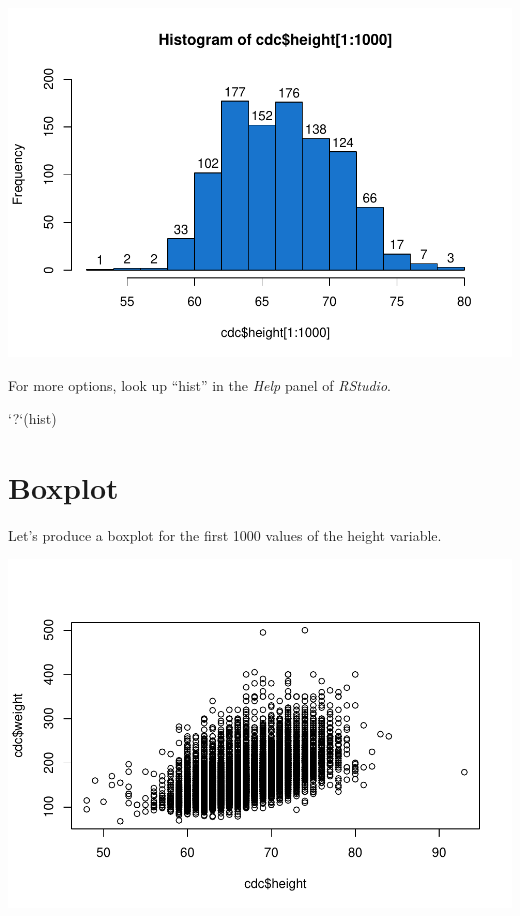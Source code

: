\documentclass[
]{book}
\newenvironment{Shaded}{\begin{snugshade}}{\end{snugshade}}
\newcommand{\DataTypeTok}[1]{\textcolor[rgb]{0.13,0.29,0.53}{#1}}
\newcommand{\DecValTok}[1]{\textcolor[rgb]{0.00,0.00,0.81}{#1}}
\newcommand{\KeywordTok}[1]{\textcolor[rgb]{0.13,0.29,0.53}{\textbf{#1}}}
\newcommand{\NormalTok}[1]{#1}
\newcommand{\OperatorTok}[1]{\textcolor[rgb]{0.81,0.36,0.00}{\textbf{#1}}}
\newcommand{\StringTok}[1]{\textcolor[rgb]{0.31,0.60,0.02}{#1}}
\begin{document}
\includegraphics{_main_files/figure-latex/unnamed-chunk-174-1.pdf}

For more options, look up ``hist'' in the \emph{Help} panel of \emph{RStudio}.

\begin{Shaded}
\begin{Highlighting}[]
\StringTok{`}\DataTypeTok{?}\StringTok{`}\NormalTok{(hist)}
\end{Highlighting}
\end{Shaded}

\hypertarget{boxplot}{%
\section{Boxplot}\label{boxplot}}

Let's produce a boxplot for the first 1000 values of the height variable.

\begin{Shaded}
\end{Shaded}

\includegraphics{_main_files/figure-latex/unnamed-chunk-176-1.pdf}
\end{document}
